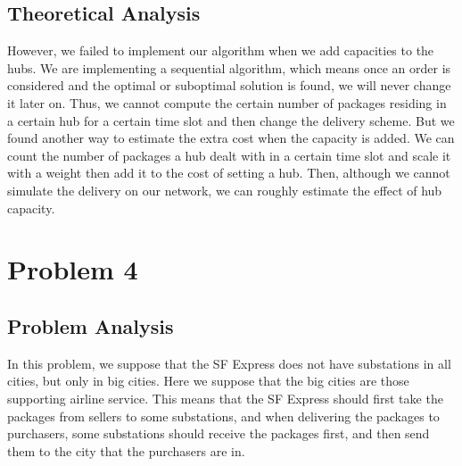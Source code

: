 \documentclass{llncs}
\begin{document}
\subsection{Theoretical Analysis}
However, we failed to implement our algorithm when we add capacities to the hubs. We are implementing a sequential algorithm, which means once an order is considered and the optimal or suboptimal solution is found, we will never change it later on. Thus, we cannot compute the certain number of packages residing in a certain hub for a certain time slot and then change the delivery scheme. But we found another way to estimate the extra cost when the capacity is added. We can count the number of packages a hub dealt with in a certain time slot and scale it with a weight then add it to the cost of setting a hub. Then, although we cannot simulate the delivery on our network, we can roughly estimate the effect of hub capacity.
\section{Problem 4}
\subsection{Problem Analysis}
In this problem, we suppose that the SF Express does not have substations in all cities, but only in big cities. Here we suppose that the big cities are those supporting airline service. 
This means that the SF Express should first take the packages from sellers to some substations, and when delivering the packages to purchasers, some substations should receive the packages first, and then send them to the city that the purchasers are in.
\end{document}
